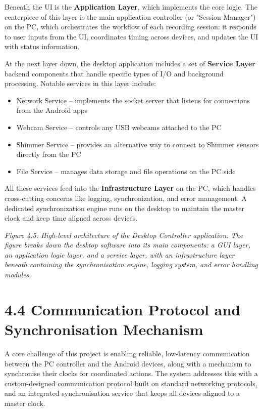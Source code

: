 Beneath the UI is the \textbf{Application Layer}, which implements the core logic. The centerpiece of this layer is the main application controller (or "Session Manager") on the PC, which orchestrates the workflow of each recording session: it responds to user inputs from the UI, coordinates timing across devices, and updates the UI with status information.

At the next layer down, the desktop application includes a set of \textbf{Service Layer} backend components that handle specific types of I/O and background processing. Notable services in this layer include:
\begin{itemize}
\item Network Service – implements the socket server that listens for connections from the Android apps
\item Webcam Service – controls any USB webcams attached to the PC
\item Shimmer Service – provides an alternative way to connect to Shimmer sensors directly from the PC
\item File Service – manages data storage and file operations on the PC side
\end{itemize}

All these services feed into the \textbf{Infrastructure Layer} on the PC, which handles cross-cutting concerns like logging, synchronization, and error management. A dedicated synchronization engine runs on the desktop to maintain the master clock and keep time aligned across devices.

\textit{Figure 4.5: High-level architecture of the Desktop Controller application. The figure breaks down the desktop software into its main components: a GUI layer, an application logic layer, and a service layer, with an infrastructure layer beneath containing the synchronisation engine, logging system, and error handling modules.}

\section{4.4 Communication Protocol and Synchronisation Mechanism}

A core challenge of this project is enabling reliable, low-latency communication between the PC controller and the Android devices, along with a mechanism to synchronise their clocks for coordinated actions. The system addresses this with a custom-designed communication protocol built on standard networking protocols, and an integrated synchronisation service that keeps all devices aligned to a master clock.

